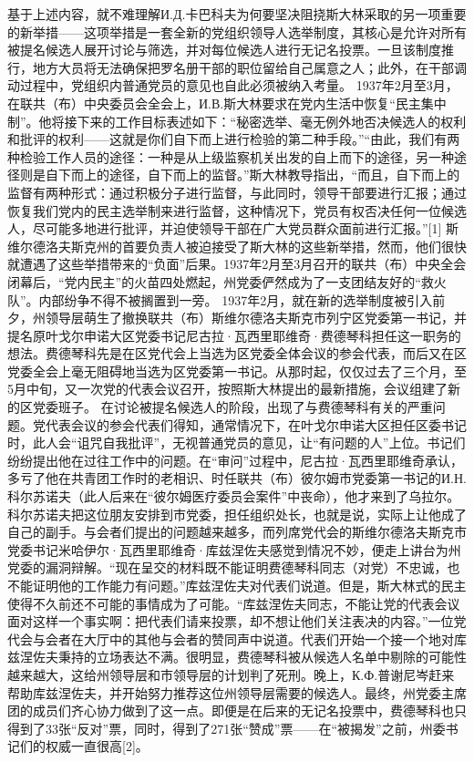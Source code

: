 
基于上述内容，就不难理解И.Д.卡巴科夫为何要坚决阻挠斯大林采取的另一项重要的新举措——这项举措是一套全新的党组织领导人选举制度，其核心是允许对所有被提名候选人展开讨论与筛选，并对每位候选人进行无记名投票。一旦该制度推行，地方大员将无法确保把罗名册干部的职位留给自己属意之人；此外，在干部调动过程中，党组织内普通党员的意见也自此必须被纳入考量。
1937年2月至3月，在联共（布）中央委员会全会上，И.В.斯大林要求在党内生活中恢复“民主集中制”。他将接下来的工作目标表述如下：“秘密选举、毫无例外地否决候选人的权利和批评的权利——这就是你们自下而上进行检验的第二种手段。”“由此，我们有两种检验工作人员的途径：一种是从上级监察机关出发的自上而下的途径，另一种途径则是自下而上的途径，自下而上的监督。”斯大林教导指出，“而且，自下而上的监督有两种形式：通过积极分子进行监督，与此同时，领导干部要进行汇报；通过恢复我们党内的民主选举制来进行监督，这种情况下，党员有权否决任何一位候选人，尽可能多地进行批评，并迫使领导干部在广大党员群众面前进行汇报。”[1]
斯维尔德洛夫斯克州的首要负责人被迫接受了斯大林的这些新举措，然而，他们很快就遭遇了这些举措带来的“负面”后果。1937年2月至3月召开的联共（布）中央全会闭幕后，“党内民主”的火苗四处燃起，州党委俨然成为了一支团结友好的“救火队”。内部纷争不得不被搁置到一旁。
1937年2月，就在新的选举制度被引入前夕，州领导层萌生了撤换联共（布）斯维尔德洛夫斯克市列宁区党委第一书记，并提名原叶戈尔申诺大区党委书记尼古拉·瓦西里耶维奇·费德琴科担任这一职务的想法。费德琴科先是在区党代会上当选为区党委全体会议的参会代表，而后又在区党委全会上毫无阻碍地当选为区党委第一书记。从那时起，仅仅过去了三个月，至5月中旬，又一次党的代表会议召开，按照斯大林提出的最新措施，会议组建了新的区党委班子。
在讨论被提名候选人的阶段，出现了与费德琴科有关的严重问题。党代表会议的参会代表们得知，通常情况下，在叶戈尔申诺大区担任区委书记时，此人会“诅咒自我批评”，无视普通党员的意见，让“有问题的人”上位。书记们纷纷提出他在过往工作中的问题。在“审问”过程中，尼古拉·瓦西里耶维奇承认，多亏了他在共青团工作时的老相识、时任联共（布）彼尔姆市党委第一书记的И.Н.科尔苏诺夫（此人后来在“彼尔姆医疗委员会案件”中丧命），他才来到了乌拉尔。科尔苏诺夫把这位朋友安排到市党委，担任组织处长，也就是说，实际上让他成了自己的副手。与会者们提出的问题越来越多，而列席党代会的斯维尔德洛夫斯克市党委书记米哈伊尔·瓦西里耶维奇·库兹涅佐夫感觉到情况不妙，便走上讲台为州党委的漏洞辩解。“现在呈交的材料既不能证明费德琴科同志（对党）不忠诚，也不能证明他的工作能力有问题。”库兹涅佐夫对代表们说道。但是，斯大林式的民主使得不久前还不可能的事情成为了可能。“库兹涅佐夫同志，不能让党的代表会议面对这样一个事实啊：把代表们请来投票，却不想让他们关注表决的内容。”一位党代会与会者在大厅中的其他与会者的赞同声中说道。代表们开始一个接一个地对库兹涅佐夫秉持的立场表达不满。很明显，费德琴科被从候选人名单中剔除的可能性越来越大，这给州领导层和市领导层的计划判了死刑。晚上，К.Ф.普谢尼岑赶来帮助库兹涅佐夫，并开始努力推荐这位州领导层需要的候选人。最终，州党委主席团的成员们齐心协力做到了这一点。即便是在后来的无记名投票中，费德琴科也只得到了33张“反对”票，同时，得到了271张“赞成”票——在“被揭发”之前，州委书记们的权威一直很高[2]。
